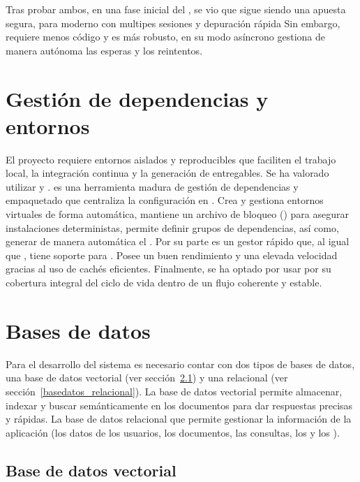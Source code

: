 Tras probar ambos, en una fase inicial del , se vio que  sigue siendo una apuesta segura, para  moderno con multipes sesiones y depuración rápida Sin embargo,  requiere menos código y es más robusto, en su modo asíncrono gestiona de manera autónoma las esperas y los reintentos. 

\section{Gestión de dependencias y entornos }
El proyecto requiere entornos aislados y reproducibles que faciliten el trabajo local, la integración continua y la generación de entregables. Se ha valorado utilizar  y .  es una herramienta madura de gestión de dependencias y empaquetado que centraliza la configuración en . Crea y gestiona entornos virtuales de forma automática, mantiene un archivo de bloqueo () para asegurar instalaciones deterministas, permite definir grupos de dependencias, así como, generar de manera automática el . Por su parte  es un gestor rápido que, al igual que , tiene soporte para . Posee un buen rendimiento y una elevada velocidad gracias al uso de cachés eficientes. Finalmente, se ha optado por usar  por su cobertura integral del ciclo de vida dentro de un flujo coherente y estable.

\section{Bases de datos}
Para el desarrollo del sistema  es necesario contar con dos tipos de bases de datos, una base de datos vectorial (ver sección~\ref{basedatos_vectorial}{\typeout{\thesubsection}}) y una relacional (ver sección~\ref{basedatos_relacional}). La base de datos vectorial permite almacenar, indexar y buscar semánticamente en los documentos para dar respuestas precisas y rápidas. La base de datos relacional que permite gestionar la información de la aplicación (los datos de los usuarios, los documentos, las consultas, los  y los ).
\subsection{Base de datos vectorial}
\label{basedatos_vectorial}

